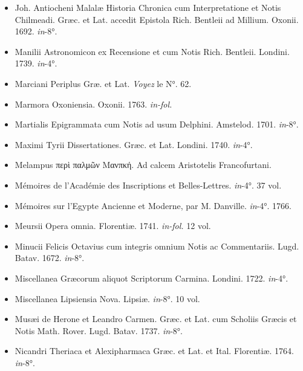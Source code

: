 \documentclass[a4paper, 18pt, oneside]{article}
\begin{document}
\begin{itemize}
    \item Joh. Antiocheni Malalæ Historia Chronica cum Interpretatione et Notis Chilmeadi. Græc. et Lat. accedit Epistola Rich. Bentleii ad Millium. Oxonii. 1692. \emph{in}-8°.

    \item Manilii Astronomicon ex Recensione et cum Notis Rich. Bentleii. Londini. 1739. \emph{in}-4°.

    \item Marciani Periplus Græ. et Lat. \emph{Voyez} le N°. 62.

    \item Marmora Oxoniensia. Oxonii. 1763. \emph{in-fol.}

    \item Martialis Epigrammata cum Notis ad usum Delphini. Amstelod. 1701. \emph{in}-8°.

    \item Maximi Tyrii Dissertationes. Græc. et Lat. Londini. 1740. \emph{in}-4°.

    \item Melampus περὶ παλμῶν Μανπκή. Ad calcem Aristotelis Francofurtani.

    \item Mémoires de l'Académie des Inscriptions et Belles-Lettres. \emph{in}-4°. 37 vol.

    \item Mémoires sur l'Egypte Ancienne et Moderne, par M. Danville. \emph{in}-4°. 1766.

    \item Meursii Opera omnia. Florentiæ. 1741. \emph{in-fol.} 12 vol.

    \item Minucii Felicis Octavius cum integris omnium Notis ac Commentariis. Lugd. Batav. 1672. \emph{in}-8°.

    \item Miscellanea Græcorum aliquot Scriptorum Carmina. Londini. 1722. \emph{in}-4°.

    \item Miscellanea Lipsiensia Nova. Lipsiæ. \emph{in}-8°. 10 vol.

    \item Musæi de Herone et Leandro Carmen. Græc. et Lat. cum Scholiis Græcis et Notis Math. Rover. Lugd. Batav. 1737. \emph{in}-8°.

    \item Nicandri Theriaca et Alexipharmaca Græc. et Lat. et Ital. Florentiæ. 1764. \emph{in}-8°.


\end{itemize}
\end{document}

